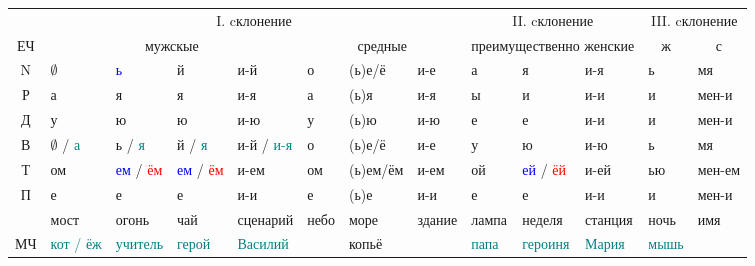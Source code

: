 \documentclass[a4paper, landscape, 11pt]{article}
\newcommand{\an}[1]{\textcolor{teal}{#1}} %
\newcommand{\us}[1]{\textcolor{blue}{#1}} %
\newcommand{\st}[1]{\textcolor{red}{#1}}  %
\begin{document}
\begin{tabularx}{\textwidth}{|c|XXXX|XXX|XXX|XX|}
	\hline
	\strut &                                        \multicolumn{7}{c|}{I. cклонение}                                         &            \multicolumn{3}{c|}{II. cклонение}             &      \multicolumn{2}{c|}{III. cклонение}       \\
	  ЕЧ   &                          \multicolumn{4}{c}{мужскые}                           &  \multicolumn{3}{c|}{средные}   &       \multicolumn{3}{c|}{преимущественно женские}        & \multicolumn{1}{c}{ж} & \multicolumn{1}{c|}{с} \\ \hline
	  N    & $\emptyset$          & \us{ь}            & й                 & и-й             & о           & (ь)е/ё   & и-е    & а                    & я                 & и-я            & ь                     & мя                     \\
	  Р    & а                    & я                 & я                 & и-я             & а           & (ь)я     & и-я    & ы                    & и                 & и-и            & и                     & мен-и                  \\
	  Д    & у                    & ю                 & ю                 & и-ю             & у           & (ь)ю     & и-ю    & е                    & е                 & и-и            & и                     & мен-и                  \\
	  В    & $\emptyset$ / \an{а} & ь / \an{я}        & й / \an{я}        & и-й / \an{и-я}  & о           & (ь)е/ё   & и-е    & у                    & ю                 & и-ю            & ь                     & мя                     \\
	  Т    & ом                   & \us{ем} / \st{ём} & \us{ем} / \st{ём} & и-ем            & ом          & (ь)ем/ём & и-ем   & ой                   & \us{ей} / \st{ёй} & и-ей           & ью                    & мен-ем                 \\
	  П    & е                    & е                 & е                 & и-и             & е           & (ь)е     & и-и    & е                    & е                 & и-и            & и                     & мен-и                  \\ \hline
	\strut & мост                 & огонь             & чай               & сценарий        & небо        & море     & здание & лампа                & неделя            & станция        & ночь                  & имя                    \\
	  МЧ   & \an{кот / ёж}        & \an{учитель}      & \an{герой}        & \an{Василий}    & \strut      & копьё    & \strut & \an{папа}            & \an{героиня}      & \an{Мария}     & \an{мышь}             & \strut                 \\ \hline

\end{tabularx}
\end{document}
